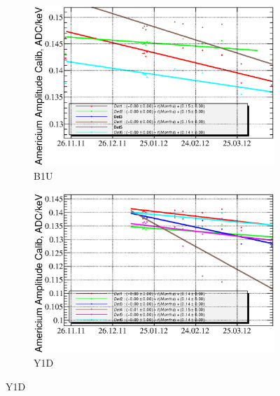 \documentclass[a4paper,12pt]{article}
\begin{document}
\begin{figure}[htb]
\begin{subfigure}[t]{0.49\textwidth}
\includegraphics[width=\textwidth]{gfx/run12_alpha/B1U/c_chAmGain_by_day_B1U.eps}
\caption{B1U}
\end{subfigure}
%
\hfill
%
\begin{subfigure}[t]{0.49\textwidth}
\includegraphics[width=\textwidth]{gfx/run12_alpha/Y1D/c_chAmGain_by_day_Y1D.eps}
\caption{Y1D}
\end{subfigure}


\end{figure}
\end{document}
